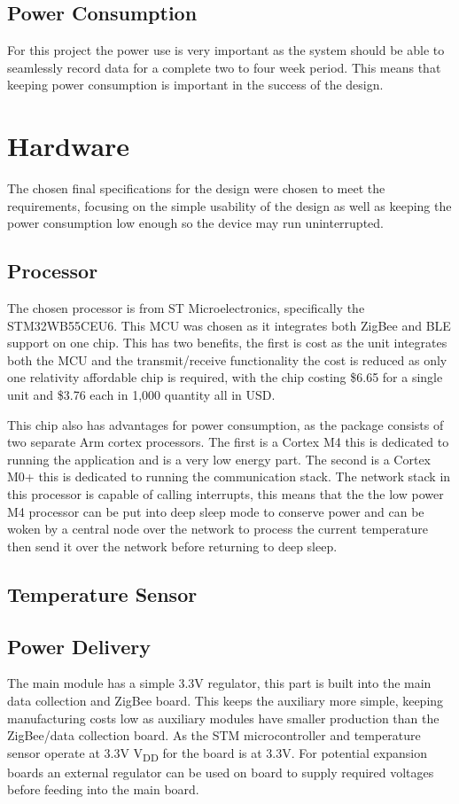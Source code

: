 \documentclass[12pt]{article}
\begin{document}
\subsection{Power Consumption}
For this project the power use is very important as the system should be able to seamlessly
record data for a complete two to four week period. This means that keeping power consumption is
important in the success of the design.

\section{Hardware}
The chosen final specifications for the design were chosen to meet the requirements, focusing on
the simple usability of the design as well as keeping the power consumption low enough so the
device may run uninterrupted.

\subsection{Processor}
The chosen processor is from ST Microelectronics, specifically the STM32WB55CEU6. This MCU was 
chosen as it integrates both ZigBee and BLE support on one chip. This has two benefits, the first 
is cost as the unit integrates both the MCU and the transmit/receive functionality the cost is 
reduced as only one relativity affordable chip is required, with the chip costing \$6.65 for a 
single unit and \$3.76 each in 1,000 quantity all in USD.

This chip also has advantages for power consumption, as the package consists of two separate Arm
cortex processors. The first is a Cortex M4 this is dedicated to running the application and is a
very low energy part. The second is a Cortex M0+ this is dedicated to running the communication
stack. The network stack in this processor is capable of calling interrupts, this means that the
the low power M4 processor can be put into deep sleep mode to conserve power and can be woken by a
central node over the network to process the current temperature then send it over the network
before returning to deep sleep. 

\subsection{Temperature Sensor}

\subsection{Power Delivery}
The main module has a simple 3.3V regulator, this part is built into the main data collection and
ZigBee board. This keeps the auxiliary more simple, keeping manufacturing costs low as auxiliary
modules have smaller production than the ZigBee/data collection board. As the STM microcontroller
and temperature sensor operate at 3.3V V\textsubscript{DD} for the board is at 3.3V. For potential
expansion boards an external regulator can be used on board to supply required voltages before
feeding into the main board. 
\end{document}

